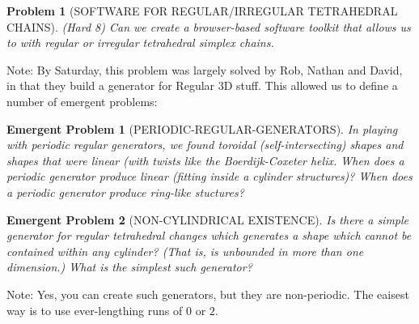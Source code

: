 \documentclass[11pt]{article}
\newtheorem{problem}{Problem}
\newtheorem{eproblem}{Emergent Problem}
\begin{document}
\begin{problem}[SOFTWARE FOR REGULAR/IRREGULAR TETRAHEDRAL CHAINS]
(Hard 8) Can we create a browser-based software toolkit that allows us to with regular or irregular tetrahedral simplex chains.  
\end{problem}

Note: By Saturday, this problem was largely solved by Rob, Nathan and David, in that they build a generator for Regular 3D stuff. This allowed us to define a number of emergent problems:

\begin{eproblem}[PERIODIC-REGULAR-GENERATORS]
  In playing with periodic regular generators, we found toroidal (self-intersecting) shapes and shapes that were linear (with twists like the Boerdijk-Coxeter helix.
  When does a periodic generator produce linear (fitting inside a cylinder structures)?
  When does a periodic generator produce ring-like stuctures?
\end{eproblem}

\begin{eproblem}[NON-CYLINDRICAL EXISTENCE]
  Is there a simple generator for regular tetrahedral changes which generates a shape which cannot be contained within any cylinder?  (That is, is unbounded in more than one dimension.) What is the simplest such generator?
\end{eproblem}

Note: Yes, you can create such generators, but they are non-periodic. The eaisest way is to use ever-lengthing runs of $0$ or $2$.
\end{document}
